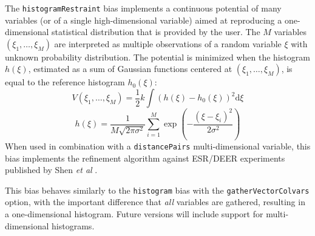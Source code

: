 
The \texttt{histogramRestraint} bias implements a continuous potential of many variables (or of a single high-dimensional variable) aimed at reproducing a one-dimensional statistical distribution that is provided by the user.
The $M$ variables $(\xi_{1}, \ldots, \xi_{M})$ are interpreted as multiple observations of a random variable $\xi$ with unknown probability distribution.
The potential is minimized when the histogram $h(\xi)$, estimated as a sum of Gaussian functions centered at $(\xi_{1}, \ldots, \xi_{M})$, is equal to the reference histogram $h_{0}(\xi)$:
\begin{equation}
  \label{eq:colvarbias_restraint_histogram}
  V(\xi_{1}, \ldots, \xi_{M}) = \frac{1}{2} k \int\left(h(\xi)-h_{0}(\xi)\right)^2 \mathrm{d}\xi
\end{equation}
\begin{equation}
  \label{eq:colvarbias_restraint_histogram_gaussian}
  h(\xi) = \frac{1}{M\sqrt{2\pi\sigma^2}} \sum_{i=1}^{M} \exp\left(-\frac{(\xi-\xi_{i})^2}{2\sigma^2}\right)
\end{equation}
When used in combination with a \texttt{distancePairs} multi-dimensional variable, this bias implements the refinement algorithm against ESR/DEER experiments published by Shen \emph{et al} \cite{Shen2015}.

This bias behaves similarly to the \texttt{histogram} bias with the \texttt{gatherVectorColvars} option, with the important difference that \emph{all} variables are gathered, resulting in a one-dimensional histogram.
Future versions will include support for multi-dimensional histograms.

